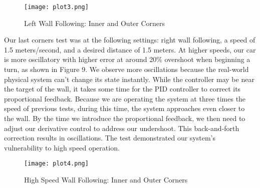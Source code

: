 \documentclass{article}
\begin{document}
\begin{figure}[H]
\begin{center}
\texttt{[image: plot3.png]} %
\caption{Left Wall Following: Inner and Outer Corners}
\end{center}
\label{workflow}
\end{figure}

Our last corners test was at the following settings: right wall following, a speed of 1.5 meters/second, and a desired distance of 1.5 meters. At higher speeds, our car is more oscillatory with higher error at around 20\% overshoot when beginning a turn, as shown in Figure 9. We observe more oscillations because the real-world physical system can't change its state instantly. While the controller may be near the target of the wall, it takes some time for the PID controller to correct its proportional feedback. Because we are operating the system at three times the speed of previous tests, during this time, the system approaches even closer to the wall. By the time we introduce the proportional feedback, we  then need to adjust our derivative control to address our undershoot. This back-and-forth correction results in oscillations. The test demonstrated our system's vulnerability to high speed operation.\\

\begin{figure}[H]
\begin{center}
\texttt{[image: plot4.png]} %
\caption{High Speed Wall Following: Inner and Outer Corners}
\end{center}
\label{workflow}
\end{figure}
\end{document}
